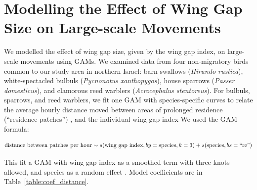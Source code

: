 \section*{Modelling the Effect of Wing Gap Size on Large-scale Movements}

We modelled the effect of wing gap size, given by the wing gap index, on large-scale movements using GAMs.
We examined data from four non-migratory birds common to our study area in northern Israel: barn swallows (\textit{Hirundo rustica}), white-spectacled bulbuls (\textit{Pycnonotus xanthopygos}), house sparrows (\textit{Passer domesticus}), and clamorous reed warblers (\textit{Acrocephalus stentoreus}).
For bulbuls, sparrows, and reed warblers, we fit one GAM with species-specific curves to relate the average hourly distance moved between areas of prolonged residence (``residence patches'') \cite{gupte2022d}, and the individual wing gap index
We used the GAM formula:
\begin{linenomath*}
    $$
        \text{distance between patches per hour} \sim s(\text{wing gap index}, by = \text{species}, k = 3) +\\
    s(\text{species}, bs = \text{``re''})      
    $$
\end{linenomath*}
This fit a GAM with wing gap index as a smoothed term with three knots allowed, and species as a random effect \cite{wood2017}.
Model coefficients are in Table~\ref{table:coef_distance}.

